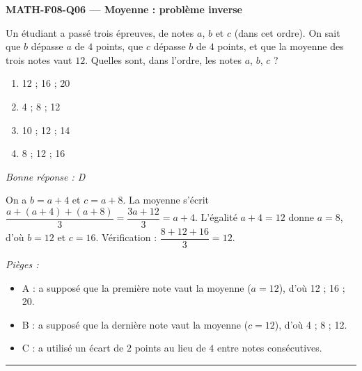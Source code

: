 \documentclass[11pt,a4paper]{article}
\begin{document}
\noindent\textbf{MATH-F08-Q06 --- Moyenne : problème inverse}\par
Un étudiant a passé trois épreuves, de notes $a$, $b$ et $c$ (dans cet ordre). On sait que $b$ dépasse $a$ de $4$ points, que $c$ dépasse $b$ de $4$ points, et que la moyenne des trois notes vaut $12$. Quelles sont, dans l'ordre, les notes $a$, $b$, $c$ ?
\begin{enumerate}[label=\Alph*)]
\item 12 ; 16 ; 20
\item 4 ; 8 ; 12
\item 10 ; 12 ; 14
\item 8 ; 12 ; 16
\end{enumerate}
\textit{Bonne réponse : D}\par
On a $b=a+4$ et $c=a+8$. La moyenne s'écrit $\dfrac{a+(a+4)+(a+8)}{3}=\dfrac{3a+12}{3}=a+4$. L'égalité $a+4=12$ donne $a=8$, d'où $b=12$ et $c=16$. Vérification : $\dfrac{8+12+16}{3}=12$.\par
\textit{Pièges :}
\begin{itemize}
\item A : a supposé que la première note vaut la moyenne ($a=12$), d'où 12 ; 16 ; 20.
\item B : a supposé que la dernière note vaut la moyenne ($c=12$), d'où 4 ; 8 ; 12.
\item C : a utilisé un écart de $2$ points au lieu de $4$ entre notes consécutives.
\end{itemize}
\vspace{8pt}\hrule\vspace{8pt}
\end{document}
